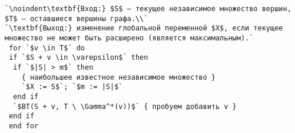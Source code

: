 \begin{lstlisting}[escapechar=`]
`\noindent\textbf{Вход:} $S$ — текущее независимое множество вершин, $T$ — оставшиеся вершины графа.\\`
`\textbf{Выход:} изменение глобальной переменной $X$, если текущее множество не может быть расширено (является максимальным).`
 for `$v \in T$` do
 if `$S + v \in \varepsilon$` then
  if `$|S| > m$` then
    { наибольшее известное независимое множество }
    `$X := S$`; `$m := |S|$`
  end if
  `$BT(S + v, T \ \Gamma^*(v))$` { пробуем добавить v }
 end if
 end for
\end{lstlisting}
